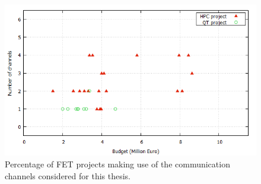 \begin{figure}[!t] 
 \begin{center}
 \includegraphics[scale=0.4]{Images/Channel_budget_breakdown.png}
 \caption{Percentage of FET projects making use of the communication channels considered for this thesis.}
 \label{Channel_budget_breakdown}
 \end{center}
\end{figure}